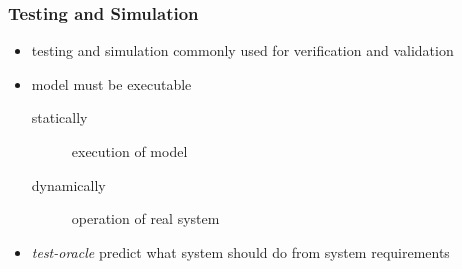 \documentclass[a4paper, 10pt]{article}
\begin{document}
\subsubsection*{Testing and Simulation}
\begin{itemize}
    \item testing and simulation \follows commonly used for verification and validation
    \item model must be executable
    \begin{description}
        \item[statically] execution of model
        \item[dynamically] operation of real system
    \end{description}
    \item \emph{test-oracle} predict what system should do \follows from system requirements
\end{itemize}
\end{document}
